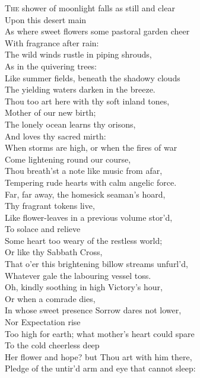 \textsc{The} shower of moonlight falls as still and clear \\
 Upon this desert main \\
 As where sweet flowers some pastoral garden cheer \\
 With fragrance after rain: \\
 The wild winds rustle in piping shrouds, \\
 As in the quivering trees: \\
 Like summer fields, beneath the shadowy clouds \\
 The yielding waters darken in the breeze. \\
  Thou too art here with thy soft inland tones, \\
 Mother of our new birth; \\
 The lonely ocean learns thy orisons, \\
 And loves thy sacred mirth: \\
 When storms are high, or when the fires of war \\
 Come lightening round our course, \\
 Thou breath’st a note like music from afar, \\
 Tempering rude hearts with calm angelic force. \\
  Far, far away, the homesick seaman’s hoard, \\
 Thy fragrant tokens live, \\
 Like flower-leaves in a previous volume stor’d, \\
 To solace and relieve \\
 Some heart too weary of the restless world; \\
 Or like thy Sabbath Cross, \\
 That o’er this brightening billow streams unfurl’d, \\
 Whatever gale the labouring vessel toss. \\
  Oh, kindly soothing in high Victory’s hour, \\
 Or when a comrade dies, \\
 In whose sweet presence Sorrow dares not lower, \\
 Nor Expectation rise \\
 Too high for earth; what mother’s heart could spare \\
 To the cold cheerless deep \\
 Her flower and hope? but Thou art with him there, \\
 Pledge of the untir’d arm and eye that cannot sleep: \\
